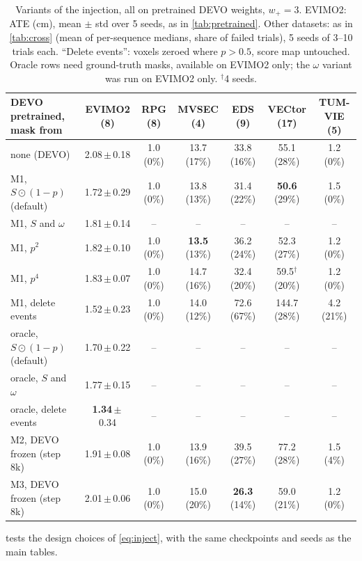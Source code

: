 \documentclass[conference]{IEEEtran}
\newcommand{\best}[1]{\textbf{#1}}
\newcommand{\pmstd}[2]{#1\,$\pm$\,#2}
\newcommand{\wplus}{w_{+}}
\begin{document}
\begin{table}[t]
\centering
\caption{Variants of the injection, all on pretrained DEVO weights, $\wplus = 3$. EVIMO2:
ATE (cm), mean $\pm$ std over 5 seeds, as in \cref{tab:pretrained}. Other datasets: as in
\cref{tab:cross} (mean of per-sequence medians, share of failed trials), 5 seeds of 3--10
trials each. ``Delete events'': voxels zeroed where $p > 0.5$, score map untouched. Oracle
rows need ground-truth masks, available on EVIMO2 only; the $\omega$ variant was run on
EVIMO2 only. $^\dagger$4 seeds.}
\label{tab:variants}
\begin{tabular}{lcccccc}
\toprule
DEVO pretrained, mask from & EVIMO2 (8) & RPG (8) & MVSEC (4) & EDS (9) & VECtor (17) & TUM-VIE (5) \\
\midrule
none (DEVO) & \pmstd{2.08}{0.18} & 1.0 (0\%) & 13.7 (17\%) & 33.8 (16\%) & 55.1 (28\%) & 1.2 (0\%) \\
\midrule
M1, $S \odot (1 - p)$ (default) & \pmstd{1.72}{0.29} & 1.0 (0\%) & 13.8 (13\%) & 31.4 (22\%) & \best{50.6} (29\%) & 1.5 (0\%) \\
M1, $S$ and $\omega$ & \pmstd{1.81}{0.14} & -- & -- & -- & -- & -- \\
M1, $p^2$ & \pmstd{1.82}{0.10} & 1.0 (0\%) & \best{13.5} (13\%) & 36.2 (24\%) & 52.3 (27\%) & 1.2 (0\%) \\
M1, $p^4$ & \pmstd{1.83}{0.07} & 1.0 (0\%) & 14.7 (16\%) & 32.4 (20\%) & 59.5$^\dagger$ (20\%) & 1.2 (0\%) \\
M1, delete events & \pmstd{1.52}{0.23} & 1.0 (0\%) & 14.0 (12\%) & 72.6 (67\%) & 144.7 (28\%) & 4.2 (21\%) \\
\midrule
oracle, $S \odot (1 - p)$ (default) & \pmstd{1.70}{0.22} & -- & -- & -- & -- & -- \\
oracle, $S$ and $\omega$ & \pmstd{1.77}{0.15} & -- & -- & -- & -- & -- \\
oracle, delete events & \pmstd{\best{1.34}}{0.34} & -- & -- & -- & -- & -- \\
\midrule
M2, DEVO frozen (step 8k) & \pmstd{1.91}{0.08} & 1.0 (0\%) & 13.9 (16\%) & 39.5 (27\%) & 77.2 (28\%) & 1.5 (4\%) \\
M3, DEVO frozen (step 8k) & \pmstd{2.01}{0.06} & 1.0 (0\%) & 15.0 (20\%) & \best{26.3} (14\%) & 59.0 (21\%) & 1.2 (0\%) \\
\bottomrule
\end{tabular}
\end{table}

 tests the design choices of \cref{eq:inject}, with the same
checkpoints and seeds as the main tables.
\end{document}
